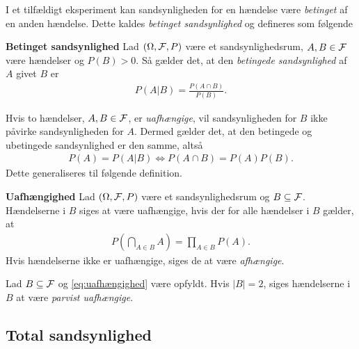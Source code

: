 I et tilfældigt eksperiment kan sandsynligheden for en hændelse være \textit{betinget} af en anden hændelse. Dette kaldes \textit{betinget sandsynlighed} og defineres som følgende

\begin{minipage}\textwidth
\begin{defn}\textbf{Betinget sandsynlighed} \label{def:betinget_sandsynlighed}%
\newline
Lad $(\Omega, \mathcal{F}, P)$ være et sandsynlighedsrum, $A,B\in \mathcal{F}$ være hændelser og $P(B)>0$. Så gælder det, at den \textit{betingede sandsynlighed} af $A$ givet $B$ er
\begin{align*}
      \displaystyle P(A|B)=\frac{P(A\cap B)}{P(B)}.
\end{align*}
\end{defn}
\end{minipage}

Hvis to hændelser, $A,B\in \mathcal{F}$, er \textit{uafhængige}, vil sandsynligheden for $B$ ikke påvirke sandsynligheden for $A$. Dermed gælder det, at den betingede og ubetingede sandsynlighed er den samme, altså
\begin{align*}
    P(A)=P(A|B)\Leftrightarrow P(A\cap B)=P(A)P(B).
\end{align*}
Dette generaliseres til følgende definition.

\begin{minipage}\textwidth
\begin{defn}\textbf{Uafhængighed}\label{def:uafhængighed} %
\newline
Lad $(\Omega, \mathcal{F}, P)$ være et sandsynlighedsrum og $B\subseteq \mathcal{F}$. Hændelserne i $B$ siges at være uafhængige, hvis der for alle hændelser i $B$ gælder, at
\begin{align}\label{eq:uafhængighed}
    P\left(\bigcap_{A\in B} A\right)=\prod_{A\in B} P(A).
\end{align}
Hvis hændelserne ikke er uafhængige, siges de at være \textit{afhængige}.
\end{defn}
\end{minipage}

Lad $B \subseteq \mathcal{F}$ og \eqref{eq:uafhængighed} være opfyldt. Hvis $|B| = 2$, siges hændelserne i $B$ at være \textit{parvist uafhængige}.

\subsection{Total sandsynlighed}

